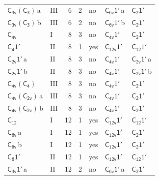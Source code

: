 \documentclass[10pt,a4paper]{article}
\numberwithin{equation}{section}
\newcommand{\grp}[1]{\mathsf{#1}}
\newcommand{\clsletter}[1]{\,{\scriptsize\color{black!55}#1}}
\begin{document}
{\begin{longtable}{@{}llrrlll@{}}
\href{C3v-C3.pdf}{$\grp{C_{3v}}(\grp{C_{3}})$}\clsletter{a} & III & 6 & 2 & no & \href{C6v-1p.pdf}{$\grp{C_{6v}1'}$}\clsletter{a} & \href{C2-1p.pdf}{$\grp{C_{2}1'}$}\\
\href{C3v-C3.pdf}{$\grp{C_{3v}}(\grp{C_{3}})$}\clsletter{b} & III & 6 & 2 & no & \href{C6v-1p.pdf}{$\grp{C_{6v}1'}$}\clsletter{b} & \href{C2-1p.pdf}{$\grp{C_{2}1'}$}\\
\href{../../../rotation/data/pdf/C4v.pdf}{$\grp{C_{4v}}$} & I & 8 & 3 & no & \href{C4v-1p.pdf}{$\grp{C_{4v}1'}$} & \href{C2-1p.pdf}{$\grp{C_{2}1'}$}\\
\href{C4-1p.pdf}{$\grp{C_{4}1'}$} & II & 8 & 1 & yes & \href{C12v-1p.pdf}{$\grp{C_{12v}1'}$} & \href{C12-1p.pdf}{$\grp{C_{12}1'}$}\\
\href{C2v-1p.pdf}{$\grp{C_{2v}1'}$}\clsletter{a} & II & 8 & 3 & no & \href{C4v-1p.pdf}{$\grp{C_{4v}1'}$} & \href{C2v-1p.pdf}{$\grp{C_{2v}1'}$}\clsletter{a}\\
\href{C2v-1p.pdf}{$\grp{C_{2v}1'}$}\clsletter{b} & II & 8 & 3 & no & \href{C4v-1p.pdf}{$\grp{C_{4v}1'}$} & \href{C2v-1p.pdf}{$\grp{C_{2v}1'}$}\clsletter{b}\\
\href{C4v-C4.pdf}{$\grp{C_{4v}}(\grp{C_{4}})$} & III & 8 & 3 & no & \href{C4v-1p.pdf}{$\grp{C_{4v}1'}$} & \href{C2-1p.pdf}{$\grp{C_{2}1'}$}\\
\href{C4v-C2v.pdf}{$\grp{C_{4v}}(\grp{C_{2v}})$}\clsletter{a} & III & 8 & 3 & no & \href{C4v-1p.pdf}{$\grp{C_{4v}1'}$} & \href{C2-1p.pdf}{$\grp{C_{2}1'}$}\\
\href{C4v-C2v.pdf}{$\grp{C_{4v}}(\grp{C_{2v}})$}\clsletter{b} & III & 8 & 3 & no & \href{C4v-1p.pdf}{$\grp{C_{4v}1'}$} & \href{C2-1p.pdf}{$\grp{C_{2}1'}$}\\
\href{../../../rotation/data/pdf/C12.pdf}{$\grp{C_{12}}$} & I & 12 & 1 & yes & \href{C12v-1p.pdf}{$\grp{C_{12v}1'}$} & \href{C12-1p.pdf}{$\grp{C_{12}1'}$}\\
\href{../../../rotation/data/pdf/C6v.pdf}{$\grp{C_{6v}}$}\clsletter{a} & I & 12 & 1 & yes & \href{C12v-1p.pdf}{$\grp{C_{12v}1'}$} & \href{C2-1p.pdf}{$\grp{C_{2}1'}$}\\
\href{../../../rotation/data/pdf/C6v.pdf}{$\grp{C_{6v}}$}\clsletter{b} & I & 12 & 1 & yes & \href{C12v-1p.pdf}{$\grp{C_{12v}1'}$} & \href{C2-1p.pdf}{$\grp{C_{2}1'}$}\\
\href{C6-1p.pdf}{$\grp{C_{6}1'}$} & II & 12 & 1 & yes & \href{C12v-1p.pdf}{$\grp{C_{12v}1'}$} & \href{C12-1p.pdf}{$\grp{C_{12}1'}$}\\
\href{C3v-1p.pdf}{$\grp{C_{3v}1'}$}\clsletter{a} & II & 12 & 2 & no & \href{C6v-1p.pdf}{$\grp{C_{6v}1'}$}\clsletter{a} & \href{C2-1p.pdf}{$\grp{C_{2}1'}$}\\

\end{longtable}}
\end{document}
